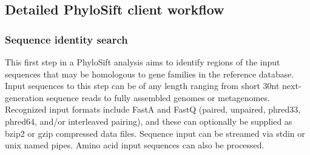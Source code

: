 \documentclass[10pt]{article}
\begin{document}
\subsection*{Detailed PhyloSift client workflow}
\subsubsection*{Sequence identity search}
This first step in a PhyloSift analysis aims to identify regions of the input sequences that may be homologous to gene families in the reference database.
Input sequences to this step can be of any length ranging from short 30nt next-generation sequence reads to fully assembled genomes or metagenomes.
Recognized input formats include FastA and FastQ (paired, unpaired, phred33, phred64, and/or interleaved pairing), and these can optionally be supplied as bzip2 or gzip compressed data files. 
Sequence input can be streamed via stdin or unix named pipes.
Amino acid input sequences can also be processed.
\end{document}
